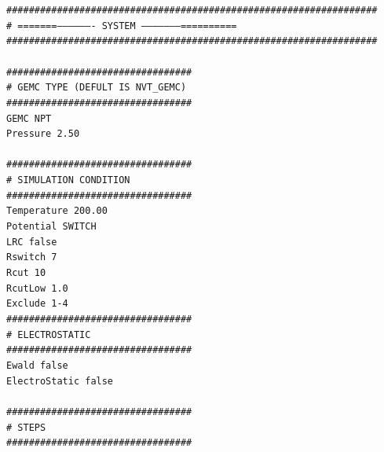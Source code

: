 \texttt{\#\#\#\#\#\#\#\#\#\#\#\#\#\#\#\#\#\#\#\#\#\#\#\#\#\#\#\#\#\#\#\#\#\#\#\#\#\#\#\#\#\#\#\#\#\#\#\#\#\#\#\#\#\#\#\#\#\#\#\#\#\#\#\#\#\#}\\
\texttt{\#  =======------------------- SYSTEM --------------------==========}\\
\texttt{\#\#\#\#\#\#\#\#\#\#\#\#\#\#\#\#\#\#\#\#\#\#\#\#\#\#\#\#\#\#\#\#\#\#\#\#\#\#\#\#\#\#\#\#\#\#\#\#\#\#\#\#\#\#\#\#\#\#\#\#\#\#\#\#\#\#}\\
\texttt{}\\
\texttt{\#\#\#\#\#\#\#\#\#\#\#\#\#\#\#\#\#\#\#\#\#\#\#\#\#\#\#\#\#\#\#\#\#}\\
\texttt{\# GEMC TYPE (DEFULT IS NVT\_GEMC)}\\
\texttt{\#\#\#\#\#\#\#\#\#\#\#\#\#\#\#\#\#\#\#\#\#\#\#\#\#\#\#\#\#\#\#\#\#}\\
\texttt{GEMC 		NPT}\\
\texttt{Pressure         2.50}\\
\texttt{}\\
\texttt{\#\#\#\#\#\#\#\#\#\#\#\#\#\#\#\#\#\#\#\#\#\#\#\#\#\#\#\#\#\#\#\#\#}\\
\texttt{\# SIMULATION CONDITION}\\
\texttt{\#\#\#\#\#\#\#\#\#\#\#\#\#\#\#\#\#\#\#\#\#\#\#\#\#\#\#\#\#\#\#\#\#}\\
\texttt{Temperature     200.00}\\
\texttt{Potential 		SWITCH}\\
\texttt{LRC		false}\\
\texttt{Rswitch		7}\\
\texttt{Rcut		10}\\
\texttt{RcutLow		1.0}\\
\texttt{Exclude 		1-4}\\
\texttt{\#\#\#\#\#\#\#\#\#\#\#\#\#\#\#\#\#\#\#\#\#\#\#\#\#\#\#\#\#\#\#\#\#}\\
\texttt{\# ELECTROSTATIC}\\
\texttt{\#\#\#\#\#\#\#\#\#\#\#\#\#\#\#\#\#\#\#\#\#\#\#\#\#\#\#\#\#\#\#\#\#}\\
\texttt{Ewald			false}\\
\texttt{ElectroStatic		false}\\
\texttt{}\\
\texttt{\#\#\#\#\#\#\#\#\#\#\#\#\#\#\#\#\#\#\#\#\#\#\#\#\#\#\#\#\#\#\#\#\#}\\
\texttt{\# STEPS}\\
\texttt{\#\#\#\#\#\#\#\#\#\#\#\#\#\#\#\#\#\#\#\#\#\#\#\#\#\#\#\#\#\#\#\#\#}\\
